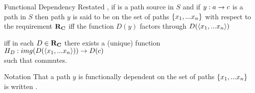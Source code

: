 \begin{frame}{Functional Dependency Restated}{\slidecontext}
\IfSforproductepimonoCwithRCwords, 
if  is a path source in $S$ and if
$y: a \rightarrow c$ is a path in $S$
then path $y$ is said to be  on the set of paths $\left\{x_1,...x_n\right\}$ with respect to the requirement $\textbf{R}_{\textbf{C}}$
iff the function $D(y)$ factors through $D(\langle x_1,... x_n \rangle)$

\pause iff in each $D \in \textbf{R}_{\textbf{C}}$ there exists a  (unique)
function $H_D: img(D(\langle x_1,... x_n \rangle)) \rightarrow D(c)$ \\
\hspace*{\fill}such that \kern14pt
 commutes.
\end{frame}

\iffalse
\begin{frame} 
CORRECT THIS DIAGRAM
\scalebox{0.9}{ 
$
\begin{array}{cp{2cm}ccp{0.5cm}cc}
                & &         & \Rnode{Eb1}{D(b_1)}& &                            &        \\[0.6cm]
                & &         & \Rnode{Eb2}{D(b_2)}& &                            &        \\[0.6cm]
                & &\vdots   &                     & &                            &        \\[0.2cm]                                              
\Rnode{Ea}{D(a)} & &         & \Rnode{Ebn}{D(b_n)}& & \Rnode{Jnctn}{}            &        \\[1.0cm]
                & &         & \Rnode{Ec}{D(c)}   & &                            &  
\end{array}
\begin{arrows}
\simplepath{Ea}{Eb1}
\alabel{D(x_1)}
\simplepath{Ea}{Eb2}
\alabel{D(x_2)}
\simplepath{Ea}{Ebn}
\alabel{D(x_n)}
\simplepath{Ea}{Ec}
\blabel{D(y)}
\nchpmarr[15][45]{Eb1}{Ebn}{Jnctn}{Ec}
\naput[npos=-0.1]{$h_D$}
\ncarc[arcangle=15]{Eb2}{Jnctn}
\end{arrows}
$
}
\end{frame}
\fi

\begin{frame}{Notation}
That a path  $y$ is functionally dependent on the set of paths $\left\{x_1,...x_n\right\}$ 
is written  .
\end{frame}

